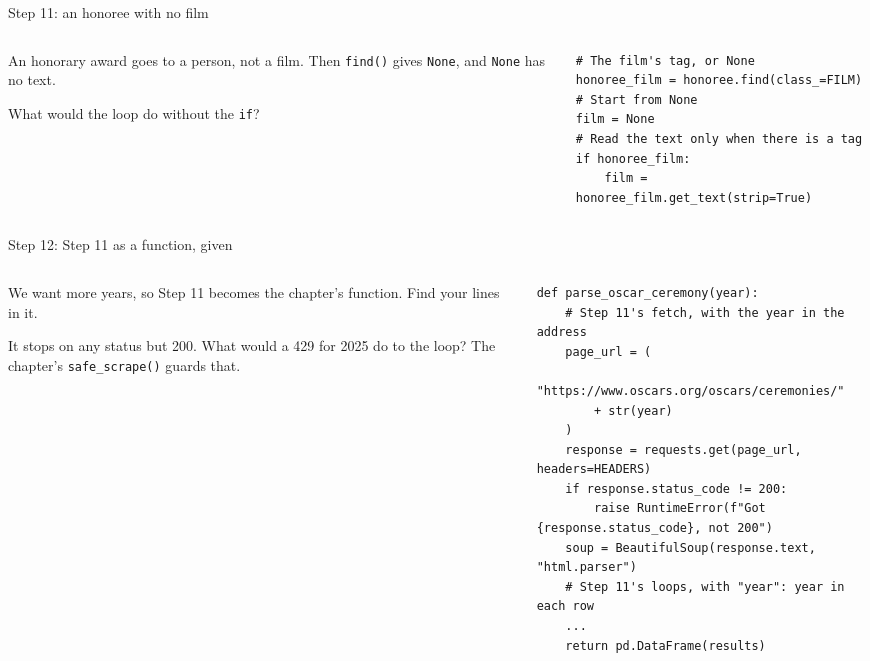 \documentclass[9pt,aspectratio=169]{beamer}
\begin{document}
\begin{frame}[fragile]{Step 11: an honoree with no film}
    \begin{columns}[T]
        \begin{column}{0.37\textwidth}
            An honorary award goes to a person, not a film. Then \texttt{find()} gives \texttt{None}, and \texttt{None} has no text.

            \medskip
            What would the loop do without the \texttt{if}?
        \end{column}
        \begin{column}{0.6\textwidth}
\begin{lstlisting}
# The film's tag, or None
honoree_film = honoree.find(class_=FILM)
# Start from None
film = None
# Read the text only when there is a tag
if honoree_film:
    film = honoree_film.get_text(strip=True)
\end{lstlisting}
        \end{column}
    \end{columns}
\end{frame}

\begin{frame}[fragile]{Step 12: Step 11 as a function, given}
    \begin{columns}[T]
        \begin{column}{0.37\textwidth}
            We want more years, so Step 11 becomes the chapter's function. Find your lines in it.

            \medskip
            It stops on any status but 200. What would a 429 for 2025 do to the loop? The chapter's \texttt{safe\_scrape()} guards that.
        \end{column}
        \begin{column}{0.6\textwidth}
\begin{lstlisting}
def parse_oscar_ceremony(year):
    # Step 11's fetch, with the year in the address
    page_url = (
        "https://www.oscars.org/oscars/ceremonies/"
        + str(year)
    )
    response = requests.get(page_url, headers=HEADERS)
    if response.status_code != 200:
        raise RuntimeError(f"Got {response.status_code}, not 200")
    soup = BeautifulSoup(response.text, "html.parser")
    # Step 11's loops, with "year": year in each row
    ...
    return pd.DataFrame(results)
\end{lstlisting}
        \end{column}
    \end{columns}
\end{frame}
\end{document}
